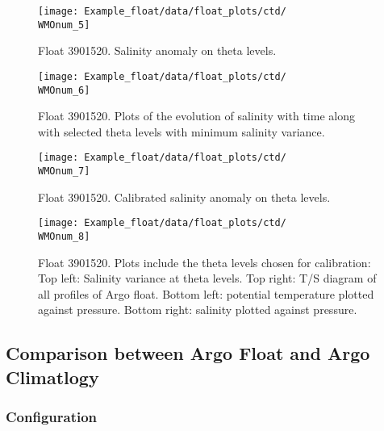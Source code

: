 \documentclass{article}
\newcommand{\WMOnum}{3901520} %
\begin{document}
\begin{flushleft}
\begin{figure}[H]
    \centering    
    \texttt{[image: Example\_float/data/float\_plots/ctd/\\WMOnum\_5]}
    \caption{Float \WMOnum. Salinity anomaly on theta levels.}
    \label{SalAnomOnTheta}
\end{figure}

\newpage
\begin{figure}[H]
    \centering    
    \texttt{[image: Example\_float/data/float\_plots/ctd/\\WMOnum\_6]}
    \caption{Float \WMOnum. Plots of the evolution of salinity with time along with selected theta levels with minimum salinity variance.}
    \label{SalErrOnTheta}
\end{figure}

\begin{figure}[H]
    \centering    
    \texttt{[image: Example\_float/data/float\_plots/ctd/\\WMOnum\_7]}
    \caption{Float \WMOnum.  Calibrated salinity anomaly on theta levels.}
    \label{CalibSalAnomOnTheta}
\end{figure}

\begin{figure}[H]
    \centering    
    \texttt{[image: Example\_float/data/float\_plots/ctd/\\WMOnum\_8]}
    \caption{Float \WMOnum. Plots include the theta levels chosen for calibration: Top left: Salinity variance at theta levels. Top right: T/S diagram of all profiles of Argo float. Bottom left: potential temperature plotted against pressure. Bottom right: salinity plotted against pressure.}
    \label{Salinity_OWlevels}
\end{figure}
\newpage
\subsection{Comparison between Argo Float and Argo Climatlogy}
\subsubsection{Configuration}
\label{Configuration2}



\end{flushleft}
\end{document}
